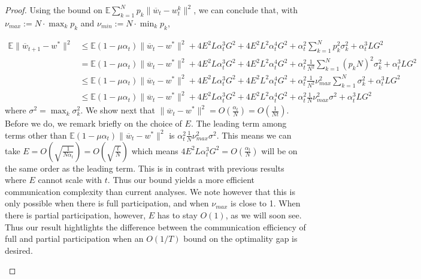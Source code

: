 \begin{proof}
	Using the bound on $\mathbb{E}\sum_{k=1}^{N}p_{k}\|\overline{w}_{t}-w_{t}^{k}\|^{2}$,
	we can conclude that, with $\nu_{max}:=N\cdot\max_{k}p_{k}$ and $\nu_{min}:=N\cdot\min_{k}p_{k}$, 
	
	\begin{align*}
	\mathbb{E}\|\overline{w}_{t+1}-w^{\ast}\|^{2} & \leq\mathbb{E}(1-\mu\alpha_{t})\|\overline{w}_{t}-w^{\ast}\|^{2}+4E^{2}L\alpha_{t}^{3}G^{2}+4E^{2}L^{2}\alpha_{t}^{4}G^{2}+\alpha_{t}^{2}\sum_{k=1}^{N}p_{k}^{2}\sigma_{k}^{2}+\alpha_{t}^{3}LG^{2}\\
	& =\mathbb{E}(1-\mu\alpha_{t})\|\overline{w}_{t}-w^{\ast}\|^{2}+4E^{2}L\alpha_{t}^{3}G^{2}+4E^{2}L^{2}\alpha_{t}^{4}G^{2}+\alpha_{t}^{2}\frac{1}{N^{2}}\sum_{k=1}^{N}(p_{k}N)^{2}\sigma_{k}^{2}+\alpha_{t}^{3}LG^{2}\\
	& \leq\mathbb{E}(1-\mu\alpha_{t})\|\overline{w}_{t}-w^{\ast}\|^{2}+4E^{2}L\alpha_{t}^{3}G^{2}+4E^{2}L^{2}\alpha_{t}^{4}G^{2}+\alpha_{t}^{2}\frac{1}{N^{2}}\nu_{max}^{2}\sum_{k=1}^{N}\sigma_{k}^{2}+\alpha_{t}^{3}LG^{2}\\
	& \leq\mathbb{E}(1-\mu\alpha_{t})\|\overline{w}_{t}-w^{\ast}\|^{2}+4E^{2}L\alpha_{t}^{3}G^{2}+4E^{2}L^{2}\alpha_{t}^{4}G^{2}+\alpha_{t}^{2}\frac{1}{N}\nu_{max}^{2}\sigma^{2}+\alpha_{t}^{3}LG^{2}
	\end{align*}
	where $\sigma^{2}=\max_{k}\sigma_{k}^{2}$. We show next that $\|\overline{w}_{t}-w^{\ast}\|^{2}=O(\frac{\alpha_{t}}{N})=O(\frac{1}{Nt})$.
	Before we do, we remark briefly on the choice of $E$. The leading
	term among terms other than $\mathbb{E}(1-\mu\alpha_{t})\|\overline{w}_{t}-w^{\ast}\|^{2}$
	is $\alpha_{t}^{2}\frac{1}{N}\nu_{max}^{2}\sigma^{2}$. This means
	we can take $E=O(\sqrt{\frac{1}{N\alpha_{t}}})=O(\sqrt{\frac{t}{N}})$
	which means $4E^{2}L\alpha_{t}^{3}G^{2}=O(\frac{\alpha_{t}}{N})$
	will be on the same order as the leading term. This is in contrast
	with previous results where $E$ cannot scale with $t$. Thus our
	bound yields a more efficient communication complexity than current
	analyses. We note however that this is only possible when there is
	full participation, and when $\nu_{max}$ is close to 1. When there
	is partial participation, however, $E$ has to stay $O(1)$, as we
	will soon see. Thus our result hightlights the difference between
	the communication efficiency of full and partial participation when
	an $O(1/T)$ bound on the optimality gap is desired. 
	
	\textbf{}%
	\begin{comment}
	The leading term on the right hand side the bound is $\alpha_{t}^{2}\frac{1}{N}\nu_{max}^{2}\sigma^{2}$,
	which when summed using the recursive relations gives $O(\alpha_{t})=O(1/t)$,
	but the constant now is scaled down by $1/N$. \textbf{To achieve
	this linear speedup, we need $\sum_{t=0}^{T}(1-\mu\alpha_{t})\|w_{0}-w^{\ast}\|^{2}$
	to be small enough. Note also that the above bound implies that $E$
	can be chosen to be as large as $O(\sqrt{\frac{T}{N}})$ without degrading
	the performance, since $E^{2}\alpha_{t}^{3}=O(\alpha_{t}^{2}/N)$
	which is the order of the leading term. As we will see, in the partial
	participation case, this is no longer true, and $E$ cannot be chosen
	$O(T^{\beta})$ for any $\beta>0$. }
	\end{comment}
	

\end{proof}
